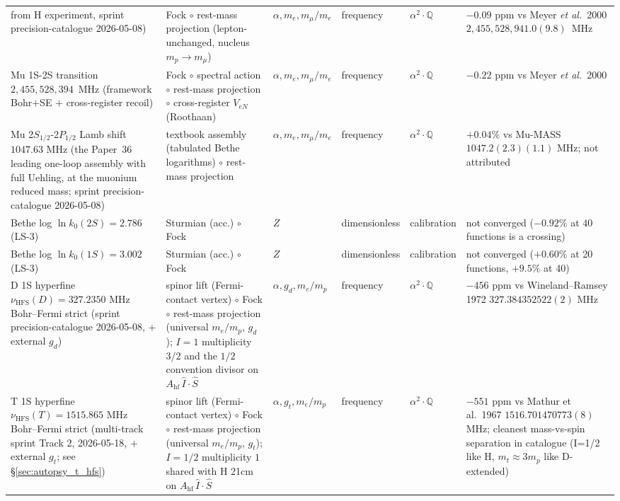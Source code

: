 \documentclass[11pt]{article}
\begin{document}
\begin{longtable}{p{3.5cm} p{2.8cm} p{1.3cm} p{2.2cm} p{1.8cm} p{1.4cm}}
from H experiment, sprint precision-catalogue 2026-05-08) & Fock $\circ$
rest-mass projection (lepton-unchanged, nucleus $m_p \to m_\mu$) &
$\alpha, m_e, m_\mu/m_e$ & frequency &
$\alpha^2{\cdot}\mathbb{Q}$ & $-0.09$ ppm vs Meyer \emph{et al.}\ 2000 $2{,}455{,}528{,}941.0(9.8)$~MHz \\
Mu 1S-2S transition $2{,}455{,}528{,}394$~MHz (framework Bohr$+$SE $+$
cross-register recoil) & Fock $\circ$ spectral action $\circ$ rest-mass
projection $\circ$ cross-register $V_{eN}$ (Roothaan) & $\alpha, m_e,
m_\mu/m_e$ & frequency & $\alpha^2{\cdot}\mathbb{Q}$ &
$-0.22$ ppm vs Meyer \emph{et al.}\ 2000 \\
Mu 2$S_{1/2}$-2$P_{1/2}$ Lamb shift $1047.63$ MHz (the Paper~36
leading one-loop assembly with full Uehling, at the muonium reduced
mass; sprint precision-catalogue 2026-05-08) &
textbook assembly (tabulated Bethe logarithms) $\circ$ rest-mass projection
& $\alpha, m_e, m_\mu/m_e$ & frequency & $\alpha^2{\cdot}\mathbb{Q}$ &
$+0.04\%$ vs Mu-MASS~\cite{ohayon2022} $1047.2(2.3)(1.1)$ MHz; not attributed \\
Bethe log $\ln k_0(2S) = 2.786$ (LS-3) & Sturmian (acc.) $\circ$ Fock & $Z$ &
dimensionless & calibration & not converged ($-0.92\%$ at 40 functions is a crossing) \\
Bethe log $\ln k_0(1S) = 3.002$ (LS-3) & Sturmian (acc.) $\circ$ Fock & $Z$ &
dimensionless & calibration & not converged ($+0.60\%$ at 20 functions, $+9.5\%$ at 40) \\
D 1S hyperfine $\nu_\text{HFS}(D) = 327.2350$ MHz Bohr--Fermi strict
(sprint precision-catalogue 2026-05-08, $+$ external $g_d$) & spinor
lift (Fermi-contact vertex) $\circ$ Fock $\circ$ rest-mass projection
(universal $m_e/m_p$, $g_d$); $I=1$ multiplicity $3/2$ and the
$1/2$ convention divisor on
$A_\text{hf}\,\hat{I}\cdot\hat{S}$ & $\alpha, g_d, m_e/m_p$ & frequency &
$\alpha^2{\cdot}\mathbb{Q}$ & $-456$ ppm vs Wineland--Ramsey 1972
$327.384352522(2)$ MHz \\
T 1S hyperfine $\nu_\text{HFS}(T) = 1515.865$ MHz Bohr--Fermi strict
(multi-track sprint Track 2, 2026-05-18, $+$ external $g_t$; see
\S\ref{sec:autopsy_t_hfs}) & spinor lift (Fermi-contact vertex)
$\circ$ Fock $\circ$ rest-mass projection (universal $m_e/m_p$, $g_t$);
$I=1/2$ multiplicity $1$ shared with H 21cm on
$A_\text{hf}\,\hat{I}\cdot\hat{S}$ & $\alpha, g_t, m_e/m_p$ & frequency &
$\alpha^2{\cdot}\mathbb{Q}$ & $-551$ ppm vs Mathur et al.\ 1967
$1516.701470773(8)$ MHz; cleanest mass-vs-spin separation in catalogue
(I=1/2 like H, $m_t \approx 3 m_p$ like D-extended) \\

\end{longtable}
\end{document}
